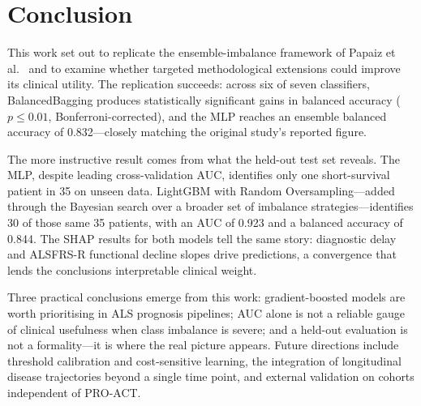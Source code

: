 \documentclass[a4paper,twoside]{article}
\begin{document}
\section{Conclusion}
\label{sec:conclusion}

This work set out to replicate the ensemble-imbalance framework of Papaiz
et al.~\cite{Papaiz2024} and to examine whether targeted methodological
extensions could improve its clinical utility. The replication succeeds: across
six of seven classifiers, BalancedBagging produces statistically significant
gains in balanced accuracy ($p \leq 0.01$, Bonferroni-corrected), and the MLP
reaches an ensemble balanced accuracy of 0.832---closely matching the original
study's reported figure.

The more instructive result comes from what the held-out test set reveals.
The MLP, despite leading cross-validation AUC, identifies only one short-survival
patient in 35 on unseen data. LightGBM with Random Oversampling---added through the Bayesian search over a
broader set of imbalance strategies---identifies 30 of those same 35 patients,
with an AUC of 0.923 and a balanced accuracy of 0.844. The SHAP results for both models tell the same story: diagnostic delay and
ALSFRS-R functional decline slopes drive predictions, a convergence that lends
the conclusions interpretable clinical weight.

Three practical conclusions emerge from this work: gradient-boosted models are
worth prioritising in ALS prognosis pipelines; AUC alone is not a reliable gauge
of clinical usefulness when class imbalance is severe; and a held-out evaluation
is not a formality---it is where the real picture appears. Future directions include threshold
calibration and cost-sensitive learning, the integration of longitudinal
disease trajectories beyond a single time point, and external validation on
cohorts independent of PRO-ACT.



{\small
}
\end{document}
